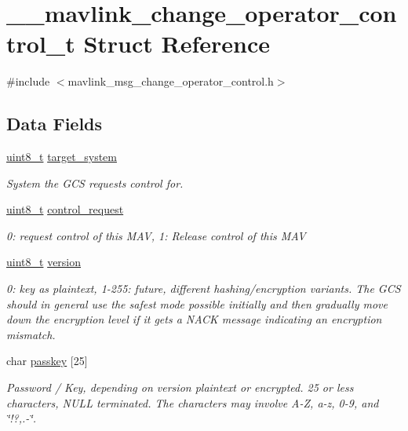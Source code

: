 \hypertarget{struct____mavlink__change__operator__control__t}{\section{\-\_\-\-\_\-mavlink\-\_\-change\-\_\-operator\-\_\-control\-\_\-t Struct Reference}
\label{struct____mavlink__change__operator__control__t}
}


{\ttfamily \#include $<$mavlink\-\_\-msg\-\_\-change\-\_\-operator\-\_\-control.\-h$>$}

\subsection*{Data Fields}
\begin{DoxyCompactItemize}
\item 
\hyperlink{stdint_8h_aba7bc1797add20fe3efdf37ced1182c5}{uint8\-\_\-t} \hyperlink{struct____mavlink__change__operator__control__t_ac68f72fea3c066f00e0ccd0b978d119a}{target\-\_\-system}
\begin{DoxyCompactList}\small\item\em System the G\-C\-S requests control for. \end{DoxyCompactList}\item 
\hyperlink{stdint_8h_aba7bc1797add20fe3efdf37ced1182c5}{uint8\-\_\-t} \hyperlink{struct____mavlink__change__operator__control__t_aef19fec531d51e7a3f57fe09a7f74c06}{control\-\_\-request}
\begin{DoxyCompactList}\small\item\em 0\-: request control of this M\-A\-V, 1\-: Release control of this M\-A\-V \end{DoxyCompactList}\item 
\hyperlink{stdint_8h_aba7bc1797add20fe3efdf37ced1182c5}{uint8\-\_\-t} \hyperlink{struct____mavlink__change__operator__control__t_a033ed1de1f96ee19a64572952e29da39}{version}
\begin{DoxyCompactList}\small\item\em 0\-: key as plaintext, 1-\/255\-: future, different hashing/encryption variants. The G\-C\-S should in general use the safest mode possible initially and then gradually move down the encryption level if it gets a N\-A\-C\-K message indicating an encryption mismatch. \end{DoxyCompactList}\item 
char \hyperlink{struct____mavlink__change__operator__control__t_ad18d971feb4c5e1826c0f6fde0085ab0}{passkey} \mbox{[}25\mbox{]}
\begin{DoxyCompactList}\small\item\em Password / Key, depending on version plaintext or encrypted. 25 or less characters, N\-U\-L\-L terminated. The characters may involve A-\/\-Z, a-\/z, 0-\/9, and \char`\"{}!?,.-\/\char`\"{}. \end{DoxyCompactList}\end{DoxyCompactItemize}


